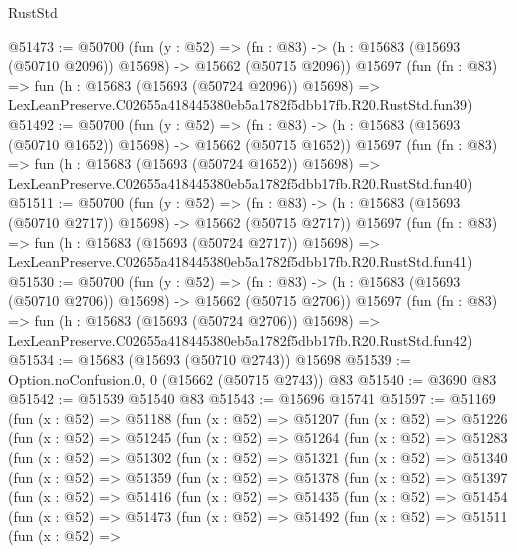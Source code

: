 \begin{lexlean}{RustStd}
\begin{coremodule}
@51473 := @50700
    (fun (y : @52) =>
    (fn : @83) -> (h : @15683 (@15693 (@50710 @2096)) @15698) -> @15662 (@50715 @2096))
    @15697
    (fun (fn : @83) =>
    fun (h : @15683 (@15693 (@50724 @2096)) @15698) =>
    LexLeanPreserve.C02655a418445380eb5a1782f5dbb17fb.R20.RustStd.fun39)
@51492 := @50700
    (fun (y : @52) =>
    (fn : @83) -> (h : @15683 (@15693 (@50710 @1652)) @15698) -> @15662 (@50715 @1652))
    @15697
    (fun (fn : @83) =>
    fun (h : @15683 (@15693 (@50724 @1652)) @15698) =>
    LexLeanPreserve.C02655a418445380eb5a1782f5dbb17fb.R20.RustStd.fun40)
@51511 := @50700
    (fun (y : @52) =>
    (fn : @83) -> (h : @15683 (@15693 (@50710 @2717)) @15698) -> @15662 (@50715 @2717))
    @15697
    (fun (fn : @83) =>
    fun (h : @15683 (@15693 (@50724 @2717)) @15698) =>
    LexLeanPreserve.C02655a418445380eb5a1782f5dbb17fb.R20.RustStd.fun41)
@51530 := @50700
    (fun (y : @52) =>
    (fn : @83) -> (h : @15683 (@15693 (@50710 @2706)) @15698) -> @15662 (@50715 @2706))
    @15697
    (fun (fn : @83) =>
    fun (h : @15683 (@15693 (@50724 @2706)) @15698) =>
    LexLeanPreserve.C02655a418445380eb5a1782f5dbb17fb.R20.RustStd.fun42)
@51534 := @15683 (@15693 (@50710 @2743)) @15698
@51539 := Option.noConfusion.{0, 0} (@15662 (@50715 @2743)) @83
@51540 := @3690 @83
@51542 := @51539 @51540 @83
@51543 := @15696 @15741
@51597 := @51169
    (fun (x : @52) =>
    @51188
      (fun (x : @52) =>
      @51207
        (fun (x : @52) =>
        @51226
          (fun (x : @52) =>
          @51245
            (fun (x : @52) =>
            @51264
              (fun (x : @52) =>
              @51283
                (fun (x : @52) =>
                @51302
                  (fun (x : @52) =>
                  @51321
                    (fun (x : @52) =>
                    @51340
                      (fun (x : @52) =>
                      @51359
                        (fun (x : @52) =>
                        @51378
                          (fun (x : @52) =>
                          @51397
                            (fun (x : @52) =>
                            @51416
                              (fun (x : @52) =>
                              @51435
                                (fun (x : @52) =>
                                @51454
                                  (fun (x : @52) =>
                                  @51473
                                    (fun (x : @52) =>
                                    @51492
                                      (fun (x : @52) =>
                                      @51511
                                        (fun (x : @52) =>

\end{coremodule}
\end{lexlean}
